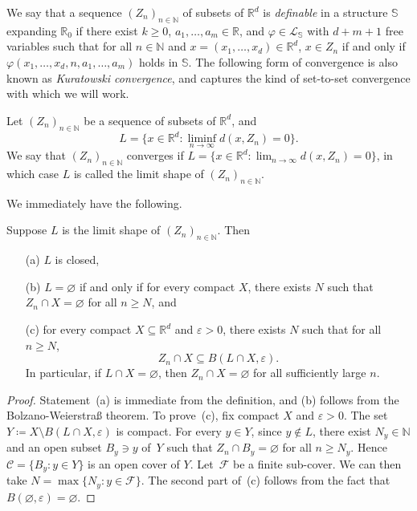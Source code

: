 \documentclass[a4paper,UKenglish,cleveref]{lipics-v2021}
\newcommand{\nat}{\mathbb{N}}
\newcommand{\rel}{\mathbb{R}}
\newcommand{\Ccal}{\mathcal{C}}
\newcommand{\Fcal}{\mathcal{F}}
\newcommand{\Lcal}{\mathcal{L}}
\newcommand{\Sb}{\mathbb{S}}
\newcommand{\seq}[1]{(#1)_{n \in \mathbb{N}}}
\begin{document}
We say that a sequence $\seq{Z_n}$ of subsets of $\rel^d$ is \emph{definable} in a structure $\Sb$ expanding $\rel_0$ if there exist $k\ge0$, $a_1,\ldots,a_m \in \rel$, and $\varphi \in \Lcal_{\Sb}$ with $d+m+1$ free variables such that for all $n \in \nat$ and $x = (x_1,\ldots,x_d) \in \rel^d$, $x \in Z_n$ if and only if $\varphi(x_1,\ldots,x_d, n, a_1,\ldots,a_m)$ holds in $\Sb$.
The following form of convergence is also known as \emph{Kuratowski convergence}, and captures the kind of set-to-set convergence with which we will work.
\begin{definition}
	\label{def-limit-shape}
	Let $\seq{Z_n}$ be a sequence of subsets of $\rel^d$, and
	\[
	L = \{x \in \rel^d \colon \liminf_{n \to \infty} d(x, Z_n) = 0\}.
	\]
	We say that $\seq{Z_n}$ converges if $L = \{x \in \rel^d \colon \lim_{n \to \infty} d(x, Z_n) = 0\}$, in which case $L$ is called the limit shape of $\seq{Z_n}$.
\end{definition}
We immediately have the following.

\begin{lemma}
	\label{thm:limshape-properties}
	Suppose $L$ is the limit shape of $(Z_n)_{n \in \nat}$. 
	Then
	\begin{itemize}
		\item[(a)] $L$ is closed, 
		\item[(b)] $L = \varnothing$ if and only if for every compact $X$, there exists $N$ such that $Z_n \cap X = \varnothing$ for all $n \ge N$, and
		\item[(c)] for every compact $X \subseteq \rel^d$ and $\varepsilon > 0$, there exists $N$ such that for all $n \ge N$, 
		\[
		Z_n \cap X \subseteq B(L \cap X, \varepsilon).
		\]
		In particular, if $L \cap X = \varnothing$, then $Z_n \cap X = \varnothing$ for all sufficiently large $n$.
	\end{itemize}
\end{lemma}
\begin{proof}
	Statement~(a) is immediate from the definition, and (b) follows from the Bolzano-Weierstra{\ss} theorem.
	To prove~(c), fix compact $X$ and $\varepsilon > 0$.
	The set $Y \coloneqq X \setminus B(L\cap X, \varepsilon)$ is compact.
	For every $y \in Y$, since $y \notin L$, there exist $N_y \in \nat$ and an open subset $B_y \ni y$ of~$Y$ such that $Z_n \cap B_y = \varnothing$ for all $n \ge N_y$.
	Hence $\Ccal = \{B_y \colon y \in Y\}$ is an open cover of $Y$.
	Let~$\Fcal$ be a finite sub-cover.
	We can then take $N = \max \{N_y \colon y \in \Fcal\}$.
	The second part of~(c) follows from the fact that $B(\varnothing, \varepsilon) = \varnothing$.
\end{proof}
\end{document}
